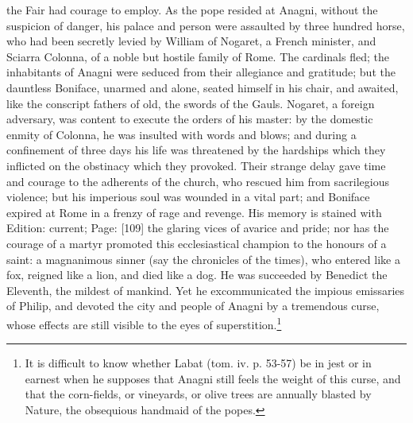 the Fair had courage to employ. As the pope resided at Anagni, without the suspicion of danger, his palace and person were assaulted by three hundred horse, who had been secretly levied by William of Nogaret, a French minister, and Sciarra Colonna, of a noble but hostile family of Rome. The cardinals fled; the inhabitants of Anagni were seduced from their allegiance and gratitude; but the dauntless Boniface, unarmed and alone, seated himself in his chair, and awaited, like the conscript fathers of old, the swords of the Gauls. Nogaret, a foreign adversary, was content to execute the orders of his master: by the domestic enmity of Colonna, he was insulted with words and blows; and during a confinement of three days his life was threatened by the hardships which they inflicted on the obstinacy which they provoked. Their strange delay gave time and courage to the adherents of the church, who rescued him from sacrilegious violence; but his imperious soul was wounded in a vital part; and Boniface expired at Rome in a frenzy of rage and revenge. His memory is stained with Edition: current; Page: [109] the glaring vices of avarice and pride; nor has the courage of a martyr promoted this ecclesiastical champion to the honours of a saint: a magnanimous sinner (say the chronicles of the times), who entered like a fox, reigned like a lion, and died like a dog. He was succeeded by Benedict the Eleventh, the mildest of mankind. Yet he excommunicated the impious emissaries of Philip, and devoted the city and people of Anagni by a tremendous curse, whose effects are still visible to the eyes of superstition.\footnote{It is difficult to know whether Labat (tom. iv. p. 53-57) be in jest or in earnest when he supposes that Anagni still feels the weight of this curse, and that the corn-fields, or vineyards, or olive trees are annually blasted by Nature, the obsequious handmaid of the popes.}

